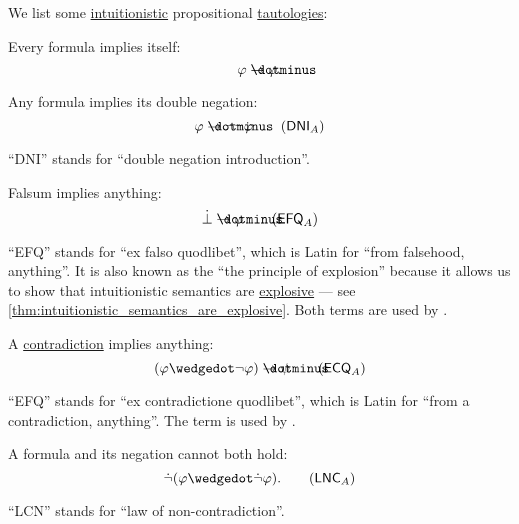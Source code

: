 \begin{proposition}\label{thm:intuitionistic_tautologies}
  We list some \hyperref[def:propositional_semantics/intuitionistic]{intuitionistic} propositional \hyperref[def:propositional_tautology]{tautologies}:
  \begin{thmenum}
     Every formula implies itself:
    \begin{equation}\label{eq:thm:intuitionistic_tautologies/self}
      \varphi \synimplies \varphi.
    \end{equation}

     Any formula implies its double negation:
    \begin{equation}\label{eq:thm:intuitionistic_tautologies/dni}
      \varphi \synimplies \neg \neg \varphi \tag{\( \logic{DNI}_A \)}
    \end{equation}

    \enquote{DNI} stands for \enquote{double negation introduction}.

     Falsum implies anything:
    \begin{equation}\label{eq:thm:intuitionistic_tautologies/efq}
      \synbot \synimplies \varphi \tag{\( \logic{EFQ}_A \)}
    \end{equation}

    \enquote{EFQ} stands for \enquote{ex falso quodlibet}, which is Latin for \enquote{from falsehood, anything}. It is also known as the \enquote{the principle of explosion} because it allows us to show that intuitionistic semantics are \hyperref[def:paraconsistent_consequence_operator]{explosive} --- see \cref{thm:intuitionistic_semantics_are_explosive}. Both terms are used by .

     A \hyperref[def:propositional_contradiction]{contradiction} implies anything:
    \begin{equation}\label{eq:thm:intuitionistic_tautologies/ecq}
      (\varphi \synwedge \neg \varphi) \synimplies \psi \tag{\( \logic{ECQ}_A \)}
    \end{equation}

    \enquote{EFQ} stands for \enquote{ex contradictione quodlibet}, which is Latin for \enquote{from a contradiction, anything}. The term is used by .

     A formula and its negation cannot both hold:
    \begin{equation}\label{eq:thm:intuitionistic_tautologies/lnc}
      \synneg (\varphi \synwedge \synneg \varphi). \tag{\( \logic{LNC}_A \)}
    \end{equation}

    \enquote{LCN} stands for \enquote{law of non-contradiction}.
  \end{thmenum}
\end{proposition}

